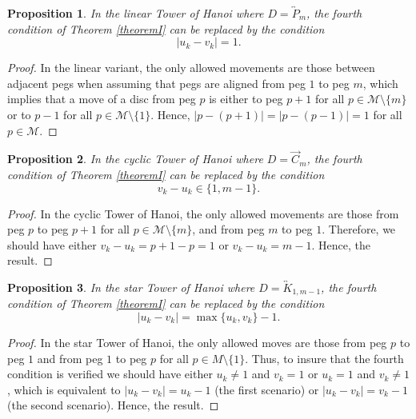 \documentclass[letterpaper,11pt]{article}
\newtheorem{proposition}{Proposition}
\begin{document}
\begin{proposition}
    
    In the linear Tower of Hanoi where $D=\overleftrightarrow{P}_{m}$, the fourth condition of Theorem \ref{theoremI} can be replaced by the condition 
    \begin{equation}
        |u_{k}-v_{k}|=1.
    \end{equation}
\end{proposition}
\begin{proof}
    In the linear variant, the only allowed movements are those between adjacent pegs when assuming that pegs are aligned from peg $1$ to peg $m$, which implies that a move of a disc from peg $p$ is either to peg $p+1$ for all $p\in \mathcal{M}\setminus\{m\}$ or to   $p-1$ for all $p\in \mathcal{M}\setminus\{1\}$. Hence, $|p-(p+1)|=|p-(p-1)|=1$ for all $p\in \mathcal{M}$.
\end{proof}

\begin{proposition}
    In the cyclic Tower of Hanoi where $D=\overrightarrow{C}_{m}$, the fourth condition of Theorem \ref{theoremI} can be replaced by the condition 
    \begin{equation}
        v_{k}-u_{k}\in\{1,m-1\}.
    \end{equation}

\end{proposition}
\begin{proof}
    In the cyclic Tower of Hanoi, the only allowed movements are those from peg $p$ to peg $p+1$ for all $p\in  \mathcal{M}\setminus\{m\}$, and from peg $m$ to peg $1$. Therefore, we should have either $v_{k}-u_{k}=p+1-p=1$ or $v_{k}-u_{k}=m-1$. Hence, the result.
\end{proof}
\begin{proposition}
    In the star Tower of Hanoi where $D=\overleftrightarrow{K}_{1,m-1}$, the fourth condition of Theorem \ref{theoremI} can be replaced by the condition 
    \begin{equation}
        |u_{k}-v_{k}|=\max\{u_{k},v_{k}\}-1.
    \end{equation}

\end{proposition}
\begin{proof}
    In the star Tower of Hanoi, the only allowed moves are those from peg $p$ to peg $1$ and from peg $1$ to peg $p$ for all $p\in M\setminus\{1\}$. Thus, to insure that the fourth condition is verified we should have either $u_{k}\neq 1$ and $v_{k}=1$ or $u_{k}=1 $ and $v_{k}\neq 1$, which is equivalent to $|u_{k}-v_{k}|=u_{k}-1$ (the first scenario) or  $|u_{k}-v_{k}|=v_{k}-1$ (the second scenario). Hence, the result.
\end{proof}
\end{document}
